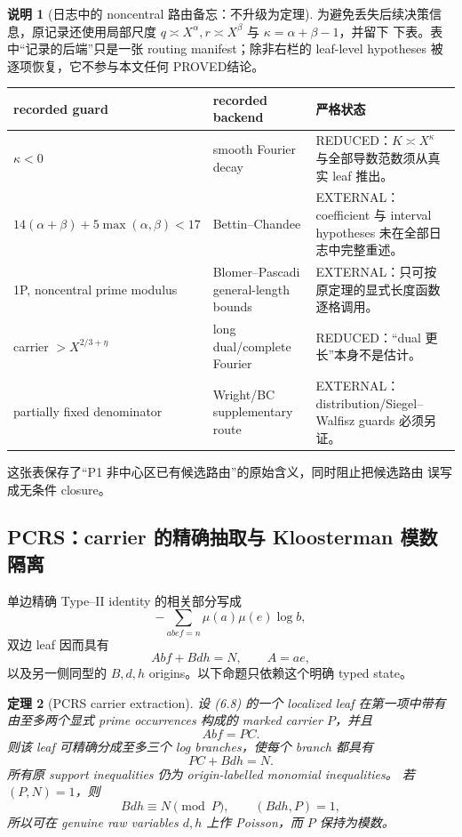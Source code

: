 \documentclass[11pt,a4paper]{ctexart}
\newtheorem{theorem}{定理}[section]
\theoremstyle{definition}
\newtheorem{remark}[theorem]{说明}
\newcommand{\1}{\mathbf 1}
\newcommand{\REDUCED}{\textcolor{orange!80!black}{\textsf{REDUCED}}}
\newcommand{\PROVED}{\textcolor{green!45!black}{\textsf{PROVED}}}
\newcommand{\EXTERNAL}{\textcolor{blue!70!black}{\textsf{EXTERNAL}}}
\begin{document}
\begin{remark}[日志中的 noncentral 路由备忘：不升级为定理]
为避免丢失后续决策信息，原记录还使用局部尺度
$q\asymp X^\alpha,r\asymp X^\beta$ 与 $\kappa=\alpha+\beta-1$，并留下
下表。表中“记录的后端”只是一张 routing manifest；除非右栏的 leaf-level
hypotheses 被逐项恢复，它不参与本文任何 \PROVED 结论。
\begin{center}
\begin{tabular}{p{}p{}p{}}
\toprule
recorded guard & recorded backend & 严格状态\\
\midrule
$\kappa<0$ & smooth Fourier decay
& \REDUCED：$K\asymp X^\kappa$ 与全部导数范数须从真实 leaf 推出。\\
$14(\alpha+\beta)+5\max(\alpha,\beta)<17$
& Bettin--Chandee
& \EXTERNAL：coefficient 与 interval hypotheses 未在全部日志中完整重述。\\
1P, noncentral prime modulus
& Blomer--Pascadi general-length bounds
& \EXTERNAL：只可按原定理的显式长度函数逐格调用。\\
carrier $>X^{2/3+\eta}$
& long dual/complete Fourier
& \REDUCED：“dual 更长”本身不是估计。\\
partially fixed denominator
& Wright/BC supplementary route
& \EXTERNAL：distribution/Siegel--Walfisz guards 必须另证。\\
\bottomrule
\end{tabular}
\end{center}
这张表保存了“P1 非中心区已有候选路由”的原始含义，同时阻止把候选路由
误写成无条件 closure。
\end{remark}

\subsection{PCRS：carrier 的精确抽取与 Kloosterman 模数隔离}

单边精确 Type--II identity 的相关部分写成
\[
-\!\sum_{abef=n}\mu(a)\mu(e)\log b,                  \tag{6.7}
\]
双边 leaf 因而具有
\[
A b f+B d h=N,\qquad A=ae,                            \tag{6.8}
\]
以及另一侧同型的 $B,d,h$ origins。以下命题只依赖这个明确 typed state。

\begin{theorem}[PCRS carrier extraction]\label{thm:pcrs}
设 (6.8) 的一个 localized leaf 在第一项中带有由至多两个显式 prime
occurrences 构成的 marked carrier $P$，并且
\[
A b f=P C.                                             \tag{6.9}
\]
则该 leaf 可精确分成至多三个 log branches，使每个 branch 都具有
\[
\boxed{P C+Bdh=N}.                                    \tag{6.10}
\]
所有原 support inequalities 仍为 origin-labelled monomial inequalities。
若 $(P,N)=1$，则
\[
Bdh\equiv N\pmod P,\qquad (Bdh,P)=1,                 \tag{6.11}
\]
所以可在 genuine raw variables $d,h$ 上作 Poisson，而 $P$ 保持为模数。
\end{theorem}
\end{document}
